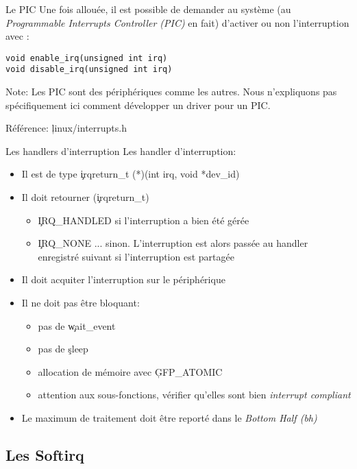 \begin{frame}[fragile=singleslide]{Le PIC}
  Une  fois  allouée, il  est  possible  de  demander au  système  (au
  \emph{Programmable Interrupts  Controller (PIC)} en  fait) d'activer
  ou non l'interruption avec :
  \begin{lstlisting}
void enable_irq(unsigned int irq)
void disable_irq(unsigned int irq)
  \end{lstlisting} 

  Note:  Les  PIC  sont  des  périphériques  comme  les  autres.  Nous
  n'expliquons  pas spécifiquement  ici comment  développer  un driver
  pour un PIC.

  Référence:  \c{linux/interrupts.h}
\end{frame}

\begin{frame}[fragile=singleslide]{Les handlers d'interruption}
  Les handler d'interruption:
  \begin{itemize} 
  \item Il est de type \c{irqreturn_t (*)(int irq, void *dev_id)}
  \item Il doit retourner (\c{irqreturn_t})
    \begin{itemize} 
    \item  \c{IRQ_HANDLED} si l'interruption a bien été gérée
    \item \c{IRQ_NONE}  ... sinon. L'interruption est  alors passée au
      handler enregistré suivant si l'interruption est partagée
    \end{itemize} 
  \item Il doit acquiter l'interruption sur le périphérique
  \item Il ne doit pas être bloquant: 
    \begin{itemize} 
    \item pas de \c{wait_event}
    \item pas de \c{sleep}
    \item allocation de mémoire avec \c{GFP_ATOMIC}
    \item  attention aux sous-fonctions,  vérifier qu'elles  sont bien
      \emph{interrupt compliant}
    \end{itemize}
  \item  Le   maximum  de  traitement   doit  être  reporté   dans  le
    \emph{Bottom Half (bh)}
  \end{itemize}  
\end{frame} 

\subsection{Les Softirq}


